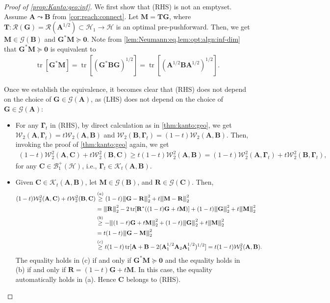 \documentclass[noinfoline]{imsart}\setcounter{tocdepth}{2}
\newcommand{\m}[1]{\mathbf{#1}} %
\newcommand{\s}[1]{\mathscr{#1}} %
\renewcommand{\c}[1]{\mathcal{#1}} %
\DeclareMathOperator*{\tr}{tr}
\newcommand{\vertii}[1]{{\vert\kern-0.25ex\vert\kern-0.25ex\vert #1 
    \vert\kern-0.25ex\vert\kern-0.25ex\vert}} %
\theoremstyle{plain}
\begin{document}
\begin{proof}[Proof of \cref{prop:Kanto:geo:inf}]
We first show that (RHS) is not an emptyset. Assume $\m{A} \leadsto \m{B}$ from \cref{cor:reach:connect}. Let $\m{M} = \m{T} \m{G}$, where $\m{T}: \c{R}(\m{G}) = \c{R}(\m{A}^{1/2}) \subset \c{H}_{1} \rightarrow \c{H}$ is an optimal pre-pushforward. Then, we get $\m{M} \in \s{G}(\m{B})$ and $\m{G}^{*} \m{M} \succeq \m{0}$. Note from \cref{lem:Neumann:eq,lem:opt:algn:inf-dim} that $\m{G}^{*} \m{M} \succeq \m{0}$ is equivalent to
\begin{align*}
    \tr[\m{G}^{*} \m{M}] = \tr [(\m{G}^{*} \m{B} \m{G})^{1/2}] = \tr [(\m{A}^{1/2} \m{B} \m{A}^{1/2})^{1/2}].
\end{align*}

Once we establish the equivalence, it becomes clear that (RHS) does not depend on the choice of $\m{G} \in \c{G}(\m{A})$, as (LHS) does not depend on the choice of $\m{G} \in \c{G}(\m{A})$:

\begin{itemize}[leftmargin = *]
\item [$(\supseteq)$] For any $\m{\Gamma}_{t}$ in (RHS), by direct calculation as in \cref{thm:kanto:geo}, we get $\c{W}_{2}(\m{A}, \m{\Gamma}_{t}) = t \c{W}_{2}(\m{A}, \m{B})$ and $\c{W}_{2}(\m{B}, \m{\Gamma}_{t}) = (1-t) \c{W}_{2}(\m{A}, \m{B})$. Then, invoking the proof of \cref{thm:kanto:geo} again, we get
\begin{align*}
    (1-t) \c{W}_{2}^{2}(\m{A}, \m{C}) + t \c{W}_{2}^{2}(\m{B}, \m{C}) \ge
    t (1-t) \c{W}_{2}^{2}(\m{A}, \m{B}) = (1-t) \c{W}_{2}^{2}(\m{A}, \m{\Gamma}_{t}) + t \c{W}_{2}^{2}(\m{B}, \m{\Gamma}_{t}),
\end{align*}
for any $\m{C} \in \c{B}_{1}^{+}(\c{H})$, i.e., $\m{\Gamma}_{t} \in \c{K}_{t}(\m{A}, \m{B})$.

\item [$(\subseteq)$] Given $\m{C} \in \c{K}_{t}(\m{A}, \m{B})$, let $\m{M} \in \c{G}(\m{B})$, and $\m{R} \in \c{G}(\m{C})$. Then,
\begin{align*}
    (1-t) \c{W}_{2}^{2}(\m{A}, \m{C}) + t \c{W}_{2}^{2}(\m{B}, \m{C}) &\stackrel{(a)}{\ge} (1-t) \vertii{\m{G} - \m{R}}_{2}^{2} + t \vertii{\m{M} - \m{R}}_{2}^{2} \\
    &= \vertii{\m{R}}_{2}^{2} - 2 \tr [\m{R}^{*} ((1-t) \m{G} + t \m{M})] + (1-t) \vertii{\m{G}}_{2}^{2} + t \vertii{\m{M}}_{2}^{2} \\
    &\stackrel{(b)}{\ge} - \vertii{(1-t) \m{G} + t \m{M}}_{2}^{2} + (1-t) \vertii{\m{G}}_{2}^{2} + t \vertii{\m{M}}_{2}^{2} \\
    &= t(1-t) \vertii{\m{G} - \m{M}}_{2}^{2} \\
    &\stackrel{(c)}{\ge} t(1-t) \tr[\m{A} + \m{B} - 2(\m{A}_{1}^{1/2} \m{A}_{2} \m{A}_{1}^{1/2})^{1/2}] = t(1-t) \c{W}_{2}^{2}(\m{A}, \m{B}).
\end{align*}
The equality holds in (c) if and only if $\m{G}^{*} \m{M} \succeq \m{0}$ and the equality holds in (b) if and only if $\m{R} = (1-t) \m{G} + t \m{M}$. In this case, the equality automatically holds in (a). Hence $\m{C}$ belongs to (RHS).
\end{itemize}
\end{proof}
\end{document}
